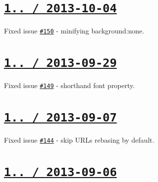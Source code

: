 \section*{\href{https://github.com/jakubpawlowicz/clean-css/compare/v1.1.2...v1.1.3}{\tt 1.. / 2013-\/10-\/04} }


\begin{DoxyItemize}
\item Fixed issue \href{https://github.com/jakubpawlowicz/clean-css/issues/150}{\tt \#150} -\/ minifying {\ttfamily background\+:none}.
\end{DoxyItemize}

\section*{\href{https://github.com/jakubpawlowicz/clean-css/compare/v1.1.1...v1.1.2}{\tt 1.. / 2013-\/09-\/29} }


\begin{DoxyItemize}
\item Fixed issue \href{https://github.com/jakubpawlowicz/clean-css/issues/149}{\tt \#149} -\/ shorthand {\ttfamily font} property.
\end{DoxyItemize}

\section*{\href{https://github.com/jakubpawlowicz/clean-css/compare/v1.1.0...v1.1.1}{\tt 1.. / 2013-\/09-\/07} }


\begin{DoxyItemize}
\item Fixed issue \href{https://github.com/jakubpawlowicz/clean-css/issues/144}{\tt \#144} -\/ skip U\+R\+Ls rebasing by default.
\end{DoxyItemize}

\section*{\href{https://github.com/jakubpawlowicz/clean-css/compare/v1.0.12...v1.1.0}{\tt 1.. / 2013-\/09-\/06} }


